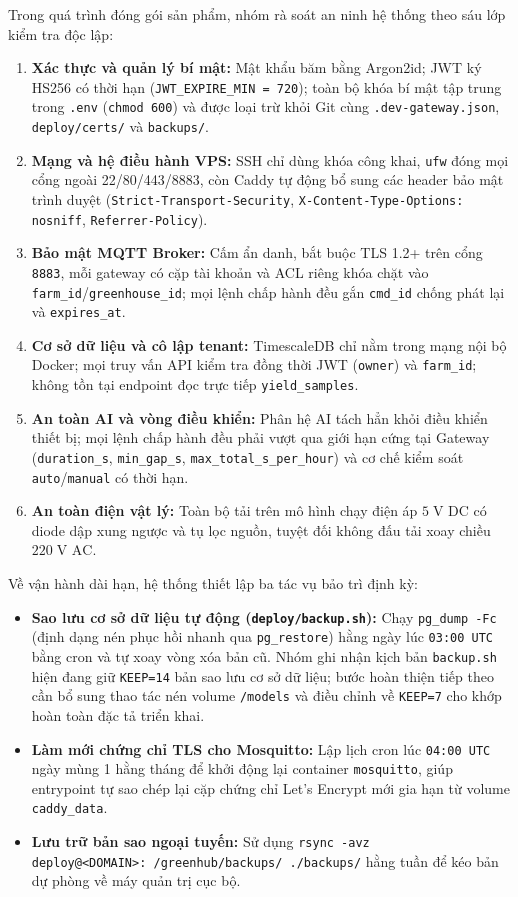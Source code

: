 Trong quá trình đóng gói sản phẩm, nhóm rà soát an ninh hệ thống theo sáu lớp kiểm tra độc lập:
\begin{enumerate}[leftmargin=*]
    \item \textbf{Xác thực và quản lý bí mật:} Mật khẩu băm bằng Argon2id; JWT ký HS256 có thời hạn (\texttt{JWT\_EXPIRE\_MIN = 720}); toàn bộ khóa bí mật tập trung trong \texttt{.env} (\texttt{chmod 600}) và được loại trừ khỏi Git cùng \texttt{.dev-gateway.json}, \texttt{deploy/certs/} và \texttt{backups/}.
    \item \textbf{Mạng và hệ điều hành VPS:} SSH chỉ dùng khóa công khai, \texttt{ufw} đóng mọi cổng ngoài 22/80/443/8883, còn Caddy tự động bổ sung các header bảo mật trình duyệt (\texttt{Strict-Transport-Security}, \texttt{X-Content-Type-Options: nosniff}, \texttt{Referrer-Policy}).
    \item \textbf{Bảo mật MQTT Broker:} Cấm ẩn danh, bắt buộc TLS 1.2+ trên cổng \texttt{8883}, mỗi gateway có cặp tài khoản và ACL riêng khóa chặt vào \texttt{farm\_id}/\texttt{greenhouse\_id}; mọi lệnh chấp hành đều gắn \texttt{cmd\_id} chống phát lại và \texttt{expires\_at}.
    \item \textbf{Cơ sở dữ liệu và cô lập tenant:} TimescaleDB chỉ nằm trong mạng nội bộ Docker; mọi truy vấn API kiểm tra đồng thời JWT (\texttt{owner}) và \texttt{farm\_id}; không tồn tại endpoint đọc trực tiếp \texttt{yield\_samples}.
    \item \textbf{An toàn AI và vòng điều khiển:} Phân hệ AI tách hẳn khỏi điều khiển thiết bị; mọi lệnh chấp hành đều phải vượt qua giới hạn cứng tại Gateway (\texttt{duration\_s}, \texttt{min\_gap\_s}, \texttt{max\_total\_s\_per\_hour}) và cơ chế kiểm soát \texttt{auto}/\texttt{manual} có thời hạn.
    \item \textbf{An toàn điện vật lý:} Toàn bộ tải trên mô hình chạy điện áp \(5\;\text{V DC}\) có diode dập xung ngược và tụ lọc nguồn, tuyệt đối không đấu tải xoay chiều \(220\;\text{V AC}\).
\end{enumerate}

Về vận hành dài hạn, hệ thống thiết lập ba tác vụ bảo trì định kỳ:
\begin{itemize}[leftmargin=*]
    \item \textbf{Sao lưu cơ sở dữ liệu tự động (\texttt{deploy/backup.sh}):} Chạy \texttt{pg\_dump -Fc} (định dạng nén phục hồi nhanh qua \texttt{pg\_restore}) hằng ngày lúc \texttt{03:00 UTC} bằng cron và tự xoay vòng xóa bản cũ. Nhóm ghi nhận kịch bản \texttt{backup.sh} hiện đang giữ \texttt{KEEP=14} bản sao lưu cơ sở dữ liệu; bước hoàn thiện tiếp theo cần bổ sung thao tác nén volume \texttt{/models} và điều chỉnh về \texttt{KEEP=7} cho khớp hoàn toàn đặc tả triển khai.
    \item \textbf{Làm mới chứng chỉ TLS cho Mosquitto:} Lập lịch cron lúc \texttt{04:00 UTC} ngày mùng 1 hằng tháng để khởi động lại container \texttt{mosquitto}, giúp entrypoint tự sao chép lại cặp chứng chỉ Let's Encrypt mới gia hạn từ volume \texttt{caddy\_data}.
    \item \textbf{Lưu trữ bản sao ngoại tuyến:} Sử dụng \texttt{rsync -avz deploy@<DOMAIN>:~/greenhub/backups/ ./backups/} hằng tuần để kéo bản dự phòng về máy quản trị cục bộ.
\end{itemize}

